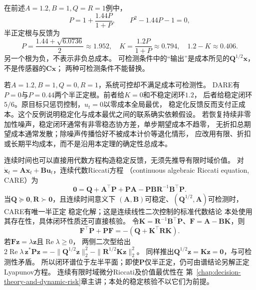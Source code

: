 在前述$A=1.2,B=1,Q=R=1$例中，
\[
  P=1+\frac{1.44P}{1+P},
  \qquad P^2-1.44P-1=0,
\]
半正定根与反馈为
\[
  P=\frac{1.44+\sqrt{6.0736}}2\approx1.952,
  \quad K=\frac{1.2P}{1+P}\approx0.794,
  \quad 1.2-K\approx0.406.
\]
另一个根为负，不表示非负总成本。
可检测条件中的“输出”是成本所见的$\bm Q^{1/2}\bm x$，不是传感器的$\bm C\bm x$；
两种可检测条件不能替换。

若$A=1.2,B=1,Q=0,R=1$，系统可控却不满足成本可检测性。
DARE有$P=0$与$P=0.44$两个半正定根。前者给$K=0$和不稳定闭环$1.2$，
后者给稳定闭环$5/6$。原目标只惩罚控制，$u_t=0$以零成本全局最优，
稳定化反馈反而支付正成本。这个反例说明稳定化与成本最优之间的联系确实依赖假设。
若恢复持续非零加性噪声，稳定闭环通常有非零稳态协方差，单步期望成本不趋零，
无折扣总期望成本通常发散；除噪声传播恰好不被成本计价等退化情形，
应改用有限、折扣或长期平均成本，而不是沿用本定理的确定性总成本。

连续时间也可以直接用代数方程构造稳定反馈，无须先推导有限时域价值。
对$\dot{\bm x}_t=\bm A\bm x_t+\bm B\bm u_t$，连续代数Riccati方程
（continuous algebraic Riccati equation, CARE）为
\begin{equation}
  \bm0=\bm Q+\bm A^\top\bm P+\bm P\bm A
       -\bm P\bm B\bm R^{-1}\bm B^\top\bm P.
  \label{eq:control-care}
\end{equation}
当$\bm Q\succeq\bm0,\bm R\succ\bm0$，且连续时间意义下
$(\bm A,\bm B)$可稳定、$(\bm Q^{1/2},\bm A)$可检测时，CARE有唯一半正定
稳定化解；这是连续线性二次控制的标准代数结论
本处使用其存在性，具体闭环性质还可直接核验。
令$\bm K=\bm R^{-1}\bm B^\top\bm P$、$\bm F=\bm A-\bm B\bm K$，则
\[
  \bm F^\top\bm P+\bm P\bm F=-(\bm Q+\bm K^\top\bm R\bm K).
\]
若$\bm F\bm z=\lambda\bm z$且$\operatorname{Re}\lambda\geq0$，
两侧二次型给出
$2\operatorname{Re}\lambda\,\bm z^\ast\bm P\bm z
=-\|\bm Q^{1/2}\bm z\|_2^2-\|\bm R^{1/2}\bm K\bm z\|_2^2$。
同样推出$\bm Q^{1/2}\bm z=\bm K\bm z=\bm0$，与可检测性矛盾。
所以闭环谱位于左半平面；即使$\bm P$仅半正定，仍可由谱结论另解正定Lyapunov方程。
连续有限时域微分Riccati及价值最优性在
第~\ref{chap:decision-theory-and-dynamic-risk}章主讲；本处的稳定核验不以它们为前提。

